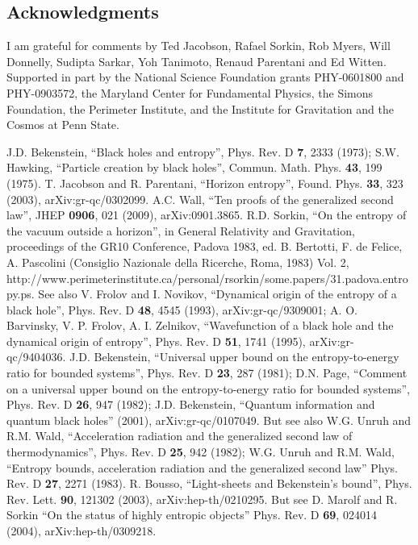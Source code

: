 \documentclass[12pt]{article}
\begin{document}
\small
\subsection*{Acknowledgments}
I am grateful for comments by Ted Jacobson, Rafael Sorkin, Rob Myers, Will Donnelly, Sudipta Sarkar, Yoh Tanimoto, Renaud Parentani and Ed Witten.  Supported in part by the National Science Foundation grants PHY-0601800 and PHY-0903572, the Maryland Center for Fundamental Physics, the Simons Foundation, the Perimeter Institute, and the Institute for Gravitation and the Cosmos at Penn State.

\begin{thebibliography}{299}
J.D. Bekenstein, ``Black holes and entropy'', Phys. Rev. D \textbf{7}, 2333 (1973); S.W. Hawking, ``Particle creation by black holes'', Commun. Math. Phys. \textbf{43}, 199 (1975).
T. Jacobson and R. Parentani, ``Horizon entropy'', Found. Phys. \textbf{33}, 323 (2003), arXiv:gr-qc/0302099.
A.C. Wall, ``Ten proofs of the generalized second law'', JHEP \textbf{0906}, 021 (2009), arXiv:0901.3865.
R.D. Sorkin, ``On the entropy of the vacuum outside a horizon'', in General Relativity and Gravitation, proceedings of the GR10 Conference, Padova 1983, ed. B. Bertotti, F. de Felice,
A. Pascolini (Consiglio Nazionale della Ricerche, Roma, 1983) Vol. 2, \\
 http://www.perimeterinstitute.ca/personal/rsorkin/some.papers/31.padova.entropy.ps.
See also V. Frolov and I. Novikov, ``Dynamical origin of the entropy of a black hole'', Phys. Rev. D \textbf{48}, 4545 (1993), arXiv:gr-qc/9309001; A. O. Barvinsky, V. P. Frolov, A. I. Zelnikov, ``Wavefunction of a black hole and the dynamical origin of entropy'', Phys. Rev. D \textbf{51}, 1741 (1995), arXiv:gr-qc/9404036.
J.D. Bekenstein, ``Universal upper bound on the entropy-to-energy ratio for bounded systems'', Phys. Rev. D \textbf{23}, 287 (1981); D.N. Page, ``Comment on a universal upper bound on the entropy-to-energy ratio for bounded systems'', Phys. Rev. D \textbf{26}, 947 (1982); J.D. Bekenstein, ``Quantum information and quantum black holes'' (2001), arXiv:gr-qc/0107049.  But see also W.G. Unruh and R.M. Wald, ``Acceleration radiation and the generalized second law of thermodynamics'', Phys. Rev. D \textbf{25}, 942 (1982); W.G. Unruh and R.M. Wald, ``Entropy bounds, acceleration radiation and the generalized second law'' Phys. Rev. D \textbf{27}, 2271 (1983).
R. Bousso, ``Light-sheets and Bekenstein's bound'', Phys. Rev. Lett. \textbf{90}, 121302 (2003), arXiv:hep-th/0210295.  But see D. Marolf and R. Sorkin ``On the status of highly entropic objects'' Phys. Rev. D \textbf{69}, 024014 (2004), arXiv:hep-th/0309218.

\end{thebibliography}
\end{document}

